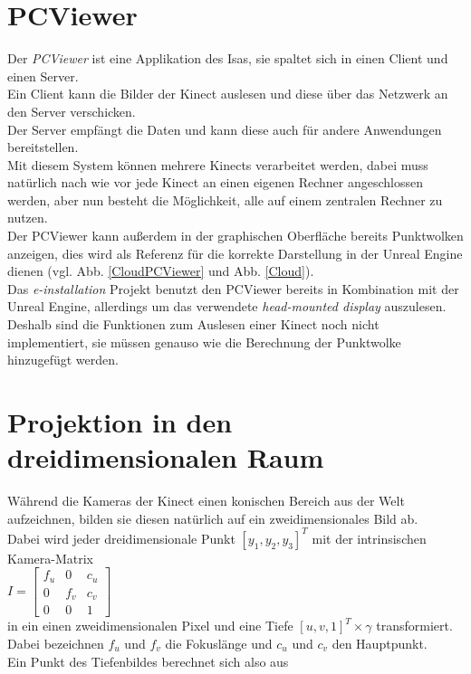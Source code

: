 \documentclass[a4paper]{IEEEtran}
\begin{document}
\section{PCViewer}
	Der {\textit{PCViewer}} ist eine Applikation des Isas, sie spaltet sich in einen Client und einen Server. \\
	Ein Client kann die Bilder der Kinect auslesen und diese über das Netzwerk an den Server verschicken. \\
	Der Server empfängt die Daten und kann diese auch für andere Anwendungen bereitstellen.\\
	Mit diesem System können mehrere Kinects verarbeitet werden, dabei muss natürlich nach wie vor jede Kinect an einen eigenen Rechner angeschlossen werden, aber nun besteht die Möglichkeit, alle auf einem zentralen Rechner zu nutzen.\\
	Der PCViewer kann außerdem in der graphischen Oberfläche bereits Punktwolken anzeigen, dies wird als Referenz für die korrekte Darstellung in der Unreal Engine dienen (vgl. Abb. \ref{CloudPCViewer} und Abb. \ref{Cloud}). \\
	Das {\textit{e-installation}} Projekt benutzt den PCViewer bereits in Kombination mit der Unreal Engine, allerdings um das verwendete {\textit{head-mounted display}} auszulesen. \\
	Deshalb sind die Funktionen zum Auslesen einer Kinect noch nicht implementiert, sie müssen genauso wie die Berechnung der Punktwolke hinzugefügt werden. \\[0.5cm]
	



\section{Projektion in den dreidimensionalen Raum}
	Während die Kameras der Kinect einen konischen Bereich aus der Welt aufzeichnen, bilden sie diesen natürlich auf ein zweidimensionales Bild ab. \\
	Dabei wird jeder dreidimensionale Punkt $[y_1,y_2,y_3]^T$ mit der intrinsischen Kamera-Matrix \\ [1cm]

$I = \begin{bmatrix}
f_u & 0 & c_u  \\
0 & f_v & c_v  \\
0 & 0 & 1  
\end{bmatrix}$\\[1cm]

	in ein einen zweidimensionalen Pixel und eine Tiefe $[u,v,1]^T \times \gamma$ transformiert. \\
	Dabei bezeichnen $f_u$ und $f_v$ die Fokuslänge und $c_u$ und $c_v$ den Hauptpunkt. \\
	Ein Punkt des Tiefenbildes berechnet sich also aus \\[1cm]
\end{document}
